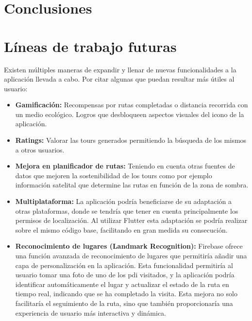 \section*{Conclusiones}
\section*{Líneas de trabajo futuras}
Existen múltiples maneras de expandir y llenar de nuevas funcionalidades a la aplicación llevada a cabo.
Por citar algunas que puedan resultar más útiles al usuario:
\begin{itemize}
    \item \textbf{Gamificación:} Recompensas por rutas completadas o distancia recorrida con un medio ecológico. Logros que desbloqueen aspectos visuales del icono de la aplicación.
    \item \textbf{Ratings:} Valorar las tours generados permitiendo la búsqueda de los mismos a otros usuarios.
    \item \textbf{Mejora en planificador de rutas:} Teniendo en cuenta otras fuentes de datos que mejoren la sostenibilidad de los tours como por ejemplo información satelital que determine las rutas en función de la zona de sombra.
    \item \textbf{Multiplataforma:} La aplicación podría beneficiarse de su adaptación a otras plataformas, donde se tendría que tener en cuenta principalmente los permisos de localización. Al utilizar Flutter esta adaptación se podría realizar sobre el mismo código base, facilitando en gran medida su consecución.
	\item \textbf{Reconocimiento de lugares (Landmark Recognition):} Firebase ofrece una función avanzada de reconocimiento de lugares \cite{firebase_mlkit_landmarks} que permitiría añadir una capa de personalización en la aplicación. Esta funcionalidad permitiría al usuario tomar una foto de uno de los \acrlong{pdi} visitados, y la aplicación podría identificar automáticamente el lugar y actualizar el estado de la ruta en tiempo real, indicando que se ha completado la visita. Esta mejora no solo facilitaría el seguimiento de la ruta, sino que también proporcionaría una experiencia de usuario más interactiva y dinámica.
\end{itemize}